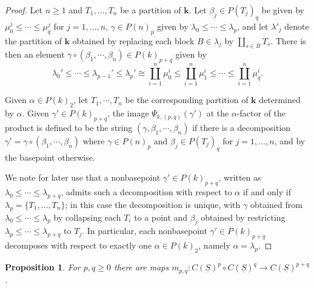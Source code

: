 \documentclass[12pt]{amsart}
\newtheorem{proposition}[subsection]{Proposition}
\theoremstyle{definition}
\theoremstyle{remark}
\newcommand{\uS}{\underline{S}}
\begin{document}
\begin{proof}
    Let $n\geq 1$ and $T_1,\dots,T_n$ be a partition of $\mathbf{k}$. Let $\beta_j\in P(T_j)_q$ be given by $\mu_0^j\leq \cdots \leq \mu^j_q$ for $j=1,\dots,n$, $\gamma\in P(n)_p$ given by $\lambda_0 \leq \cdots \leq \lambda_p$, and let $\lambda'_j$ denote the partition of $\mathbf{k}$ obtained by replacing each block $B\in \lambda_j$ by $\coprod_{s\in B} T_s$. There is then an element $\gamma\circ (\beta_1,\cdots,\beta_n) \in P(k)_{p+q}$ given by \[ \lambda_0'\leq \cdots \leq \lambda_{p-1}' \leq \lambda_p' \cong \coprod_{i=1}^{n} \mu^i_0 \leq \coprod_{i=1}^n \mu^i_1 \leq \cdots \leq \coprod_{i=1}^n \mu^i_q.\]
    
    Given $\alpha\in P(k)_2$, let $T_1,\cdots,T_n$ be the corresponding partition of $\mathbf{k}$ determined by $\alpha$. Given $\gamma'\in P(k)_{p+q}$, the image $\Psi_{k,(p,q)}(\gamma')$ at the $\alpha$-factor of the product is defined to be the string $(\gamma,\beta_1,\cdots,\beta_n)$ if there is a decomposition $\gamma'=\gamma\circ (\beta_1,\cdots,\beta_n)$ where $\gamma\in P(n)_p$ and $\beta_j\in P(T_j)_q$ for $j=1,\dots,n$, and by the basepoint otherwise. 

    We note for later use that a nonbasepoint $\gamma'\in P(k)_{p+q}$, written as $\lambda_0\leq \cdots \leq \lambda_{p+q}$, admits such a decomposition with respect to $\alpha$ if and only if $\lambda_p=\{T_1,\dots,T_n\}$; in this case the decomposition is unique, with $\gamma$ obtained from $\lambda_0\leq \cdots \leq \lambda_p$ by collapsing each $T_i$ to a point and $\beta_j$ obtained by restricting $\lambda_p\leq \cdots \leq \lambda_{p+q}$ to $T_j$. In particular, each nonbasepoint $\gamma'\in P(k)_{p+q}$ decomposes with respect to exactly one $\alpha\in P(k)_2$, namely $\alpha=\lambda_p$.

\end{proof}

\begin{proposition} \label{prop:m_p,q}
    For $p,q\geq 0$ there are maps $m_{p,q} \colon C(\uS)^p \circ C(\uS)^q \longrightarrow C(\uS)^{p+q}$.
\end{proposition}
\end{document}
